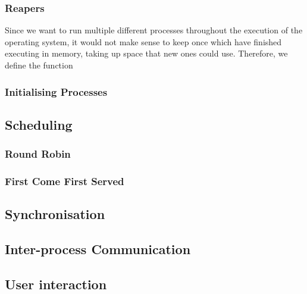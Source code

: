     \subsubsection{Reapers}
        \label{sec:cleanup}
        Since we want to run multiple different processes throughout the
        execution of the operating system, it would not make sense to keep once
        which have finished executing in memory, taking up space that new ones
        could use. Therefore, we define the  function 
    \subsubsection{Initialising Processes}

\subsection{Scheduling}
    \subsubsection{Round Robin}
        \label{sec:RoundRobin}

    \subsubsection{First Come First Served}

\subsection{Synchronisation}
\subsection{Inter-process Communication}
\subsection{User interaction}
